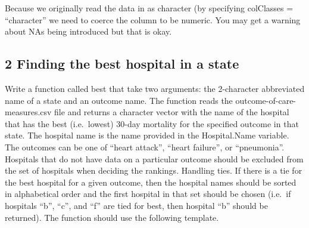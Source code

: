 \documentclass[
]{article}
\begin{document}
Because we originally read the data in as character (by specifying
colClasses = ``character'' we need to coerce the column to be numeric.
You may get a warning about NAs being introduced but that is okay.

\subsection{2 Finding the best hospital in a
state}\label{finding-the-best-hospital-in-a-state}

Write a function called best that take two arguments: the 2-character
abbreviated name of a state and an outcome name. The function reads the
outcome-of-care-measures.csv file and returns a character vector with
the name of the hospital that has the best (i.e.~lowest) 30-day
mortality for the specified outcome in that state. The hospital name is
the name provided in the Hospital.Name variable. The outcomes can be one
of ``heart attack'', ``heart failure'', or ``pneumonia''. Hospitals that
do not have data on a particular outcome should be excluded from the set
of hospitals when deciding the rankings. Handling ties. If there is a
tie for the best hospital for a given outcome, then the hospital names
should be sorted in alphabetical order and the first hospital in that
set should be chosen (i.e.~if hospitals ``b'', ``c'', and ``f'' are tied
for best, then hospital ``b'' should be returned). The function should
use the following template.
\end{document}
